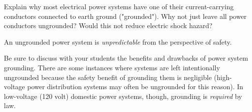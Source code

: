 

Explain why most electrical power systems have one of their current-carrying conductors connected to earth ground ("grounded").  Why not just leave all power conductors ungrounded?  Would this not reduce electric shock hazard?







An ungrounded power system is {\it unpredictable} from the perspective of safety.







Be sure to discuss with your students the benefits and drawbacks of power system grounding.  There are some instances where systems are left intentionally ungrounded because the safety benefit of grounding them is negligible (high-voltage power distribution systems may often be ungrounded for this reason).  In low-voltage (120 volt) domestic power systems, though, grounding is {\it required} by law.




